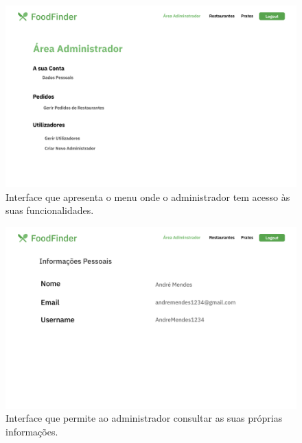 \documentclass[a4paper,12pt]{report}
\begin{document}
	\begin{figure}[H]
	\begin{center}
	\includegraphics[scale=0.25]{12.1-Area_Administrador}	
	\end{center}
	\caption{Interface que apresenta o menu onde o administrador tem acesso às suas funcionalidades.}
	\end{figure} 
	
	\begin{figure}[H]
	\begin{center}
	\includegraphics[scale=0.25]{13.1-Dados_Pessoais_Administrador}	
	\end{center}
	\caption{Interface que permite ao administrador consultar as suas próprias informações.}
	\end{figure} 
	
\end{document}
